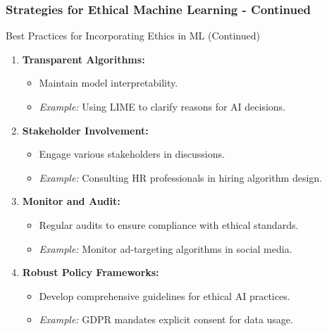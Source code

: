 \documentclass[aspectratio=169]{beamer}
\begin{document}
\begin{frame}[fragile]
    \frametitle{Strategies for Ethical Machine Learning - Continued}
    \begin{block}{Best Practices for Incorporating Ethics in ML (Continued)}
        \begin{enumerate}[resume]
            \item \textbf{Transparent Algorithms:}
                \begin{itemize}
                    \item Maintain model interpretability.
                    \item \textit{Example:} Using LIME to clarify reasons for AI decisions.
                \end{itemize}

            \item \textbf{Stakeholder Involvement:}
                \begin{itemize}
                    \item Engage various stakeholders in discussions.
                    \item \textit{Example:} Consulting HR professionals in hiring algorithm design.
                \end{itemize}

            \item \textbf{Monitor and Audit:}
                \begin{itemize}
                    \item Regular audits to ensure compliance with ethical standards.
                    \item \textit{Example:} Monitor ad-targeting algorithms in social media.
                \end{itemize}

            \item \textbf{Robust Policy Frameworks:}
                \begin{itemize}
                    \item Develop comprehensive guidelines for ethical AI practices.
                    \item \textit{Example:} GDPR mandates explicit consent for data usage.
                \end{itemize}
        \end{enumerate}
    \end{block}
\end{frame}
\end{document}
